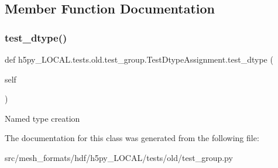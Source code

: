 \subsection{Member Function Documentation}
\mbox{\label{classh5py__LOCAL_1_1tests_1_1old_1_1test__group_1_1TestDtypeAssignment_a10037032cc575ddc44edad3134901c27}} 
\subsubsection{\texorpdfstring{test\+\_\+dtype()}{test\_dtype()}}
{\footnotesize\ttfamily def h5py\+\_\+\+L\+O\+C\+A\+L.\+tests.\+old.\+test\+\_\+group.\+Test\+Dtype\+Assignment.\+test\+\_\+dtype (\begin{DoxyParamCaption}\item[{}]{self }\end{DoxyParamCaption})}

\begin{DoxyVerb}Named type creation \end{DoxyVerb}
 

The documentation for this class was generated from the following file\+:\begin{DoxyCompactItemize}
\item 
src/mesh\+\_\+formats/hdf/h5py\+\_\+\+L\+O\+C\+A\+L/tests/old/test\+\_\+group.\+py\end{DoxyCompactItemize}
